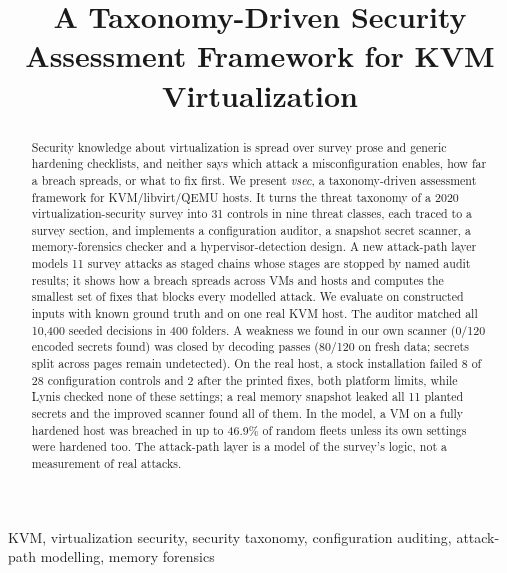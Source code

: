 \documentclass[conference]{IEEEtran}
\begin{document}
\title{A Taxonomy-Driven Security Assessment Framework for KVM Virtualization}

\author{
}

\maketitle

\begin{abstract}
Security knowledge about virtualization is spread over survey prose and generic hardening checklists, and neither says which attack a misconfiguration enables, how far a breach spreads, or what to fix first. We present \emph{vsec}, a taxonomy-driven assessment framework for KVM/libvirt/QEMU hosts. It turns the threat taxonomy of a 2020 virtualization-security survey into 31 controls in nine threat classes, each traced to a survey section, and implements a configuration auditor, a snapshot secret scanner, a memory-forensics checker and a hypervisor-detection design. A new attack-path layer models 11 survey attacks as staged chains whose stages are stopped by named audit results; it shows how a breach spreads across VMs and hosts and computes the smallest set of fixes that blocks every modelled attack. We evaluate on constructed inputs with known ground truth and on one real KVM host. The auditor matched all 10,400 seeded decisions in 400 folders. A weakness we found in our own scanner (0/120 encoded secrets found) was closed by decoding passes (80/120 on fresh data; secrets split across pages remain undetected). On the real host, a stock installation failed 8 of 28 configuration controls and 2 after the printed fixes, both platform limits, while Lynis checked none of these settings; a real memory snapshot leaked all 11 planted secrets and the improved scanner found all of them. In the model, a VM on a fully hardened host was breached in up to 46.9\% of random fleets unless its own settings were hardened too. The attack-path layer is a model of the survey's logic, not a measurement of real attacks.
\end{abstract}

\begin{IEEEkeywords}
KVM, virtualization security, security taxonomy, configuration auditing, attack-path modelling, memory forensics
\end{IEEEkeywords}
\end{document}
